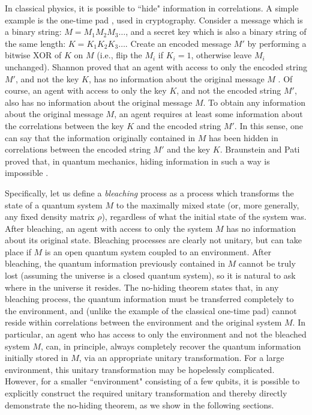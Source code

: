 In classical physics, it is possible to ``hide" information in correlations. A simple example is the one-time pad \cite{qnoh_one-time-pad}, used in cryptography. Consider a message which is a binary string: $M=M_1M_2M_3 \ldots$, and a secret key which is also a binary string of the same length: $K=K_1K_2K_3 \ldots$. Create an encoded message $M'$ by performing a bitwise XOR of $K$ on $M$ (i.e., flip the $M_i$ if $K_i=1$, otherwise leave $M_i$ unchanged). Shannon proved that an agent with access to only the encoded string $M'$, and not the key $K$, has no information about the original message $M$ \cite{qnoh_shannon1949}. Of course, an agent with access to only the key $K$, and not the encoded string $M'$, also has no information about the original message $M$. To obtain any information about the original message $M$, an agent requires at least some information about the correlations between the key $K$ and the encoded string $M'$. In this sense, one can say that the information originally contained in $M$ has been hidden in correlations between the encoded string $M'$ and the key $K$. Braunstein and Pati proved that, in quantum mechanics, hiding information in such a way is impossible \cite{qnoh_no-hiding}. 

Specifically, let us define a \textit{bleaching} process as a process which transforms the state of a quantum system $M$ to the maximally mixed state (or, more generally, any fixed density matrix $\rho$), regardless of what the initial state of the system was. After bleaching, an agent with access to only the  system $M$ has no information about its original state. Bleaching processes are clearly not unitary, but can take place if $M$ is an open quantum system coupled to an environment. After bleaching, the quantum information previously contained in $M$ cannot be truly lost (assuming the universe is a closed quantum system), so it is natural to ask where in the universe it resides. The no-hiding theorem states that, in any bleaching process, the quantum information must be transferred completely to the environment, and (unlike the example of the classical one-time pad) cannot reside within correlations between the environment and the original system $M$. In particular, an agent who has access to only the environment and not the bleached system $M$, can, in principle, always completely recover the quantum information initially stored in $M$, via an appropriate unitary transformation. For a large environment, this unitary transformation may be hopelessly complicated. However, for a smaller ``environment" consisting of a few qubits, it is possible to explicitly construct the required unitary transformation and thereby directly demonstrate the no-hiding theorem, as we show in the following sections.

